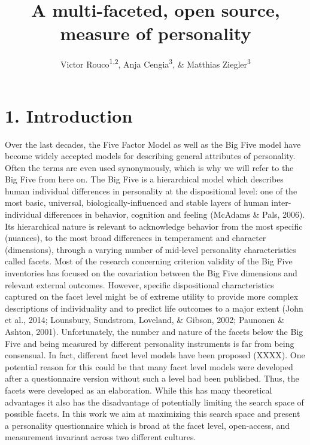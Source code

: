 \documentclass[man]{apa6}
\title{A multi-faceted, open source, measure of personality}
\author{Victor Rouco\textsuperscript{1,2}, Anja Cengia\textsuperscript{3}, \& Matthias Ziegler\textsuperscript{3}}
\affiliation{
    \vspace{0.5cm}
          \textsuperscript{1} Universitat de Barcelona\\
          \textsuperscript{2} Institut de Neurociencies Barcelona\\
          \textsuperscript{3} Humboldt Universität zu Berlin  }
\theoremstyle{definition}
\theoremstyle{definition}
\theoremstyle{definition}
\theoremstyle{remark}
\begin{document}
\maketitle

\setcounter{secnumdepth}{0}



\hypertarget{introduction}{%
\section{1. Introduction}\label{introduction}}

Over the last decades, the Five Factor Model as well as the Big Five
model have become widely accepted models for describing general
attributes of personality. Often the terms are even used synonymously,
which is why we will refer to the Big Five from here on. The Big Five is
a hierarchical model which describes human individual differences in
personality at the dispositional level: one of the most basic,
universal, biologically-influenced and stable layers of human
inter-individual differences in behavior, cognition and feeling (McAdams
\& Pals, 2006). Its hierarchical nature is relevant to acknowledge
behavior from the most specific (nuances), to the most broad differences
in temperament and character (dimensions), through a varying number of
mid-level personality characteristics called facets. Most of the
research concerning criterion validity of the Big Five inventories has
focused on the covariation between the Big Five dimensions and relevant
external outcomes. However, specific dispositional characteristics
captured on the facet level might be of extreme utility to provide more
complex descriptions of individuality and to predict life outcomes to a
major extent (John et al., 2014; Lounsbury, Sundstrom, Loveland, \&
Gibson, 2002; Paunonen \& Ashton, 2001). Unfortunately, the number and
nature of the facets below the Big Five and being measured by different
personality instruments is far from being consensual. In fact, different
facet level models have been proposed (XXXX). One potential reason for
this could be that many facet level models were developed after a
questionnaire version without such a level had been published. Thus, the
facets were developed as an elaboration. While this has many theoretical
advantages it also has the disadvantage of potentially limiting the
search space of possible facets. In this work we aim at maximizing this
search space and present a personality questionnaire which is broad at
the facet level, open-access, and measurement invariant across two
different cultures.
\end{document}
